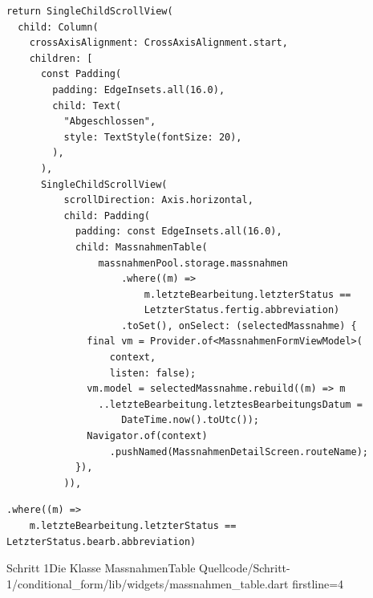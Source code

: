 \begin{listing}[htbp]
  \begin{verbatim}
return SingleChildScrollView(
  child: Column(
    crossAxisAlignment: CrossAxisAlignment.start,
    children: [
      const Padding(
        padding: EdgeInsets.all(16.0),
        child: Text(
          "Abgeschlossen",
          style: TextStyle(fontSize: 20),
        ),
      ),
      SingleChildScrollView(
          scrollDirection: Axis.horizontal,
          child: Padding(
            padding: const EdgeInsets.all(16.0),
            child: MassnahmenTable(
                massnahmenPool.storage.massnahmen
                    .where((m) =>
                        m.letzteBearbeitung.letzterStatus ==
                        LetzterStatus.fertig.abbreviation)
                    .toSet(), onSelect: (selectedMassnahme) {
              final vm = Provider.of<MassnahmenFormViewModel>(
                  context,
                  listen: false);
              vm.model = selectedMassnahme.rebuild((m) => m
                ..letzteBearbeitung.letztesBearbeitungsDatum =
                    DateTime.now().toUtc());
              Navigator.of(context)
                  .pushNamed(MassnahmenDetailScreen.routeName);
            }),
          )),
        \end{verbatim}
  \caption[Schritt 1 Ausgabe der finalen Maßnahmen]{Die Ausgabe der finalen Maßnahmen, Quelle: Eigenes Listing, \newline Datei: Quellcode/Schritt-1/conditional_form/lib/screens/massnahmen_master.dart}

  \label{lst:Schritt1AusgabeDerFinalenMaßnahmen}
\end{listing}


\begin{listing}[htbp]
  \begin{verbatim}
.where((m) =>
    m.letzteBearbeitung.letzterStatus == LetzterStatus.bearb.abbreviation)
\end{verbatim}
  \caption[Schritt 1 Bedingung der Entwurf-Maßnahmen]{Die Bedingung der Entwurf-Maßnahmen, Quelle: Eigenes Listing, \newline Datei: Quellcode/Schritt-1/conditional_form/lib/screens/massnahmen_master.dart}
  \label{lst:Schritt1BedingungDerEntwurfMaßnahmen}
\end{listing}

\begin{alexlisting}{Schritt 1}{Die Klasse MassnahmenTable}
  {Quellcode/Schritt-1/conditional_form/lib/widgets/massnahmen_table.dart}
  {firstline=4}
  \label{lst:Schritt1KlasseMassnahmenTable}
\end{alexlisting}





